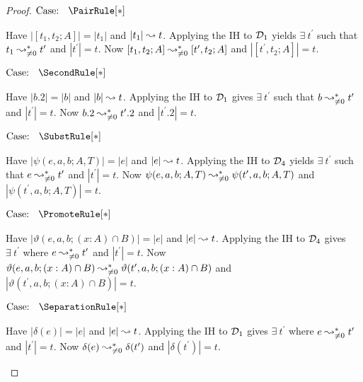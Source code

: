 \begin{proof}
    $\text{Case: }\begin{array}{c} \PairRule[*] \end{array}$
    \begin{proofcase}
        Have $|[t_1, t_2; A]| = |t_1|$ and $|t_1| \leadsto t$.
        Applying the IH to $\mathcal{D}_{1}$ yields $\exists\ t^\prime$ such that $t_1 \leadsto^*_{\neq 0} t^\prime$ and $|t^\prime| = t$.
        Now $[t_1, t_2; A] \leadsto^*_{\neq 0} [t^\prime, t_2; A]$ and $|[t^\prime, t_2; A]| = t$.
    \end{proofcase}

    $\text{Case: }\begin{array}{c} \SecondRule[*] \end{array}$
    \begin{proofcase}
        Have $|b.2| = |b|$ and $|b| \leadsto t$.
        Applying the IH to $\mathcal{D}_{1}$ gives $\exists\ t^\prime$ such that $b \leadsto^*_{\neq 0} t^\prime$ and $|t^\prime| = t$.
        Now $b.2 \leadsto^*_{\neq 0} t^\prime.2$ and $|t^\prime.2| = t$.
    \end{proofcase}

    \begin{minipage}{.8\textwidth}$\text{Case: }\begin{array}{c} \SubstRule[*] \end{array}$\end{minipage}
    \begin{proofcase}
        Have $|\psi(e, a, b; A, T)| = |e|$ and $|e| \leadsto t$.
        Applying the IH to $\mathcal{D}_{4}$ yields $\exists\ t^\prime$ such that $e \leadsto^*_{\neq 0} t^\prime$ and $|t^\prime| = t$.
        Now $\psi(e, a, b; A, T) \leadsto^*_{\neq 0} \psi(t^\prime, a, b; A, T)$
            and $|\psi(t^\prime, a, b; A, T)| = t$.
    \end{proofcase}

    $\text{Case: }\begin{array}{c} \PromoteRule[*] \end{array}$
    \begin{proofcase}
        Have $|\vartheta(e, a, b; (x : A) \cap B)| = |e|$ and $|e| \leadsto t$.
        Applying the IH to $\mathcal{D}_{4}$ gives $\exists\ t^\prime$ where $e \leadsto^*_{\neq 0} t^\prime$ and $|t^\prime| = t$.
        Now $\vartheta(e, a, b; (x : A) \cap B) \leadsto^*_{\neq 0} \vartheta(t^\prime, a, b; (x : A) \cap B)$
            and $|\vartheta(t^\prime, a, b; (x : A) \cap B)| = t$.
    \end{proofcase}

    $\text{Case: }\begin{array}{c} \SeparationRule[*] \end{array}$
    \begin{proofcase}
        Have $|\delta(e)| = |e|$ and $|e| \leadsto t$.
        Applying the IH to $\mathcal{D}_{1}$ gives $\exists\ t^\prime$ where $e \leadsto^*_{\neq 0} t^\prime$ and $|t^\prime| = t$.
        Now $\delta(e) \leadsto^*_{\neq 0} \delta(t^\prime)$ and $|\delta(t^\prime)| = t$.
    \end{proofcase}


\end{proof}
